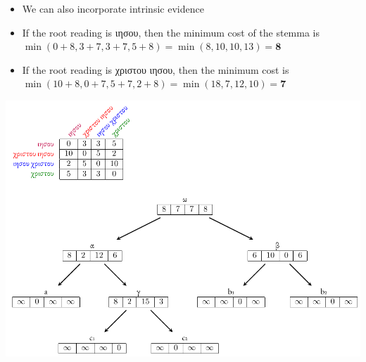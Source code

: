 \documentclass[10pt]{beamer}
\begin{document}
	\begin{frame}
		\begin{itemize}
			\item We can also incorporate intrinsic evidence
			\item If the root reading is \textgreek{ιησου}, then the minimum cost of the stemma is $\min(0+8, 3+7, 3+7, 5+8) = \min(8, 10, 10, 13) = \mathbf{8}$
			\item If the root reading is \textgreek{χριστου ιησου}, then the minimum cost is $\min(10+8, 0+7, 5+7, 2+8) = \min(18, 7, 12, 10) = \mathbf{7}$
		\end{itemize}
		\vspace{0.1\baselineskip}
		\begin{center}
			\includegraphics[scale=0.5]{../img/gene-tree-unrooted-sankoff.pdf}
		\end{center}
	\end{frame}
\end{document}
